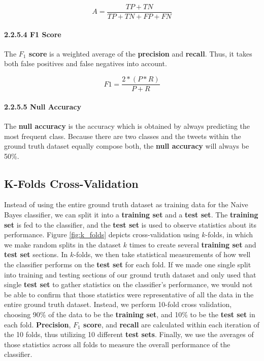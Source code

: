 \documentclass[11pt, twoside, reqno]{book}
\begin{document}
\[A=\frac{TP+TN}{TP+TN+FP+FN}\]

\paragraph{2.2.5.4  F1 Score}
\label{f1_score}

The \textbf{$F_{1}$ score} is a weighted average of the \textbf{precision} and \textbf{recall}. Thus, it takes both false positives and false negatives into account.

\[F1=\frac{2*(P*R)}{P+R}\]

\paragraph{2.2.5.5  Null Accuracy}
\label{null_accuracy}

The \textbf{null accuracy} is the accuracy which is obtained by always predicting the most frequent class. Because there are two classes and the tweets within the ground truth dataset equally compose both, the \textbf{null accuracy} will always be 50\%.

\subsection{K-Folds Cross-Validation}
\label{cross_validation}

Instead of using the entire ground truth dataset as training data for the Naive Bayes classifier, we can split it into a \textbf{training set} and a \textbf{test set}. The \textbf{training set} is fed to the classifier, and the \textbf{test set} is used to observe statistics about its performance. Figure \ref{fig:k_folds} depicts cross-validation using $k$-folds, in which we make random splits in the dataset $k$ times to create several \textbf{training set} and \textbf{test set} sections. In $k$-folds, we then take statistical measurements of how well the classifier performs on the \textbf{test set} for each fold. If we made one single split into training and testing sections of our ground truth dataset and only used that single \textbf{test set} to gather statistics on the classifier's performance, we would not be able to confirm that those statistics were representative of all the data in the entire ground truth dataset. Instead, we perform 10-fold cross validation, choosing 90\% of the data to be the \textbf{training set}, and 10\% to be the \textbf{test set} in each fold. \textbf{Precision}, \textbf{$F_{1}$ score}, and \textbf{recall} are calculated within each iteration of the 10 folds, thus utilizing 10 different \textbf{test sets}. Finally, we use the averages of those statistics across all folds to measure the overall performance of the classifier.
\end{document}
